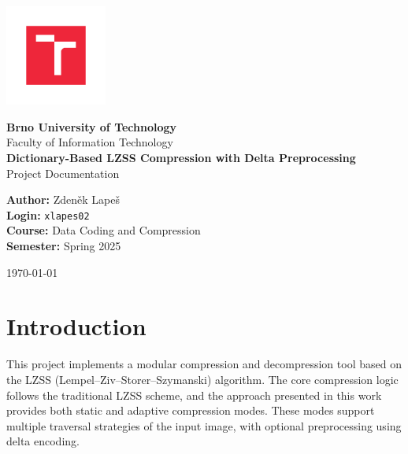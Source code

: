 \documentclass[a4paper,12pt]{article}
\begin{document}
    \begin{titlepage}
        \centering
        \vspace*{1cm}

        \includegraphics[width=0.25\textwidth]{template-fig/VUT_symbol_barevne_CMYK_CZ}\par\vspace{1cm} %

        {\Large\textbf{Brno University of Technology}}\\[0.5cm]
        {\large Faculty of Information Technology}\\[2cm]

        {\huge\bfseries Dictionary-Based LZSS Compression with Delta Preprocessing}\\[0.5cm]

        {\large Project Documentation}\\[2cm]

        \begin{flushleft}
            \textbf{Author:} Zdeněk Lapeš\\
            \textbf{Login:} \texttt{xlapes02}\\
            \textbf{Course:} Data Coding and Compression\\
            \textbf{Semester:} Spring 2025
        \end{flushleft}

        \vfill

        {\large \today}

    \end{titlepage}

    \tableofcontents
    \newpage


    \section{Introduction}

    This project implements a modular compression and decompression tool based on the LZSS (Lempel–Ziv–Storer–Szymanski) algorithm. The core compression logic follows the traditional LZSS scheme, and the approach presented in this work provides both static and adaptive compression modes. These modes support multiple traversal strategies of the input image, with optional preprocessing using delta encoding.
\end{document}
